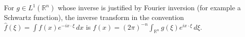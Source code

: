 
For $g\in L^1(\mathbb R^n)$ whose inverse is justified by Fourier inversion (for example a Schwartz function), the inverse transform in the convention $\widehat f(\xi)=\int f(x)e^{-ix\cdot\xi}\,dx$ is $f(x)=(2\pi)^{-n}\int_{\mathbb R^n}g(\xi)e^{ix\cdot\xi}\,d\xi$.
